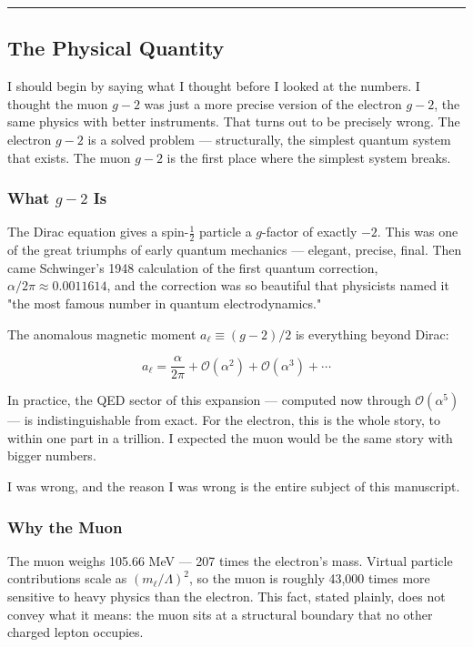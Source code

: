 \documentclass[12pt,a4paper]{article}
\begin{document}
\begin{center}
\rule{0.5\textwidth}{0.4pt}
\end{center}

\subsection{The Physical Quantity}

I should begin by saying what I thought before I looked at the numbers. I thought the muon $g-2$ was just a more precise version of the electron $g-2$, the same physics with better instruments. That turns out to be precisely wrong. The electron $g-2$ is a solved problem --- structurally, the simplest quantum system that exists. The muon $g-2$ is the first place where the simplest system breaks.

\subsubsection{What $g-2$ Is}

The Dirac equation gives a spin-$\tfrac{1}{2}$ particle a $g$-factor of exactly $-2$. This was one of the great triumphs of early quantum mechanics --- elegant, precise, final. Then came Schwinger's 1948 calculation of the first quantum correction, $\alpha/2\pi \approx 0.0011614$, and the correction was so beautiful that physicists named it "the most famous number in quantum electrodynamics."

The anomalous magnetic moment $a_{\ell} \equiv (g-2)/2$ is everything beyond Dirac:

\[a_{\ell} = \frac{\alpha}{2\pi} + \mathcal{O}(\alpha^2) + \mathcal{O}(\alpha^3) + \cdots\]

In practice, the QED sector of this expansion --- computed now through $\mathcal{O}(\alpha^5)$ --- is indistinguishable from exact. For the electron, this is the whole story, to within one part in a trillion. I expected the muon would be the same story with bigger numbers.

I was wrong, and the reason I was wrong is the entire subject of this manuscript.

\subsubsection{Why the Muon}

The muon weighs 105.66 MeV --- 207 times the electron's mass. Virtual particle contributions scale as $(m_{\ell}/\Lambda)^2$, so the muon is roughly 43,000 times more sensitive to heavy physics than the electron. This fact, stated plainly, does not convey what it means: the muon sits at a structural boundary that no other charged lepton occupies.
\end{document}
